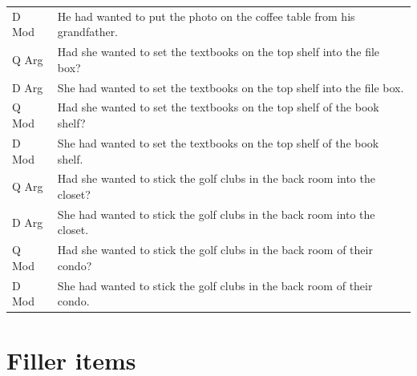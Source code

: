 \documentclass[12pt,oneside]{book}
\begin{document}
\begin{longtable}{ll}
D Mod & He had wanted to put the photo on the coffee table from his grandfather.\\
\addlinespace
Q Arg & Had she wanted to set the textbooks on the top shelf into the file box?\\
D Arg & She had wanted to set the textbooks on the top shelf into the file box.\\
Q Mod & Had she wanted to set the textbooks on the top shelf of the book shelf?\\
D Mod & She had wanted to set the textbooks on the top shelf of the book shelf.\\
\addlinespace
Q Arg & Had she wanted to stick the golf clubs in the back room into the closet?\\
D Arg & She had wanted to stick the golf clubs in the back room into the closet.\\
Q Mod & Had she wanted to stick the golf clubs in the back room of their condo?\\
D Mod & She had wanted to stick the golf clubs in the back room of their condo.\\*
\end{longtable}

\newpage

\hypertarget{appFill}{%
\chapter{Filler items}\label{appFill}}
\end{document}
